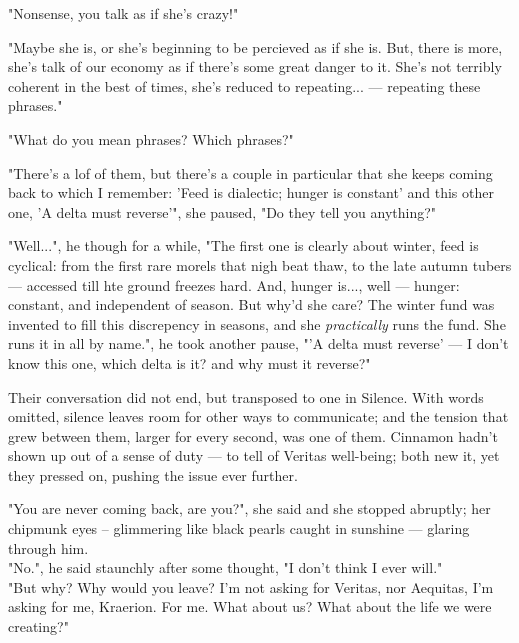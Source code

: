 
"Nonsense, you talk as if she's crazy!"

"Maybe she is, or she's beginning to be percieved as if she is. But, there is more, she's talk of our economy as if there's some great danger to it. She's not terribly coherent in the best of times, she's reduced to repeating... — repeating these phrases."

"What do you mean phrases? Which phrases?"

"There's a lof of them, but there's a couple in particular that she keeps coming back to which I remember: 'Feed is dialectic; hunger is constant' and this other one, 'A delta must reverse'", she paused, "Do they tell you anything?"

"Well...", he though for a while, "The first one is clearly about winter, feed is cyclical: from the first rare morels that nigh beat thaw, to the late autumn tubers — accessed till hte ground freezes hard. And, hunger is..., well — hunger: constant, and independent of season. 
But why'd she care? The winter fund was invented to fill this discrepency in seasons, and she \textit{practically} runs the fund. She runs it in all by name.", he took another pause, "'A delta must reverse' — I don't know this one, which delta is it? and why must it reverse?"

Their conversation did not end, but transposed to one in Silence. With words omitted, silence leaves room for other ways to communicate; and the tension that grew between them, larger for every second, was one of them. Cinnamon hadn't shown up out of a sense of duty — to tell of Veritas well-being; both new it, yet they pressed on, pushing the issue ever further.

"You are never coming back, are you?", she said and she stopped abruptly; her chipmunk eyes – glimmering like black pearls caught in sunshine — glaring through him. \\

"No.", he said staunchly after some thought, "I don't think I ever will."\\

"But why? Why would you leave? I'm not asking for Veritas, nor Aequitas, I'm asking for me, Kraerion. For me. What about us? What about the life we were creating?"

